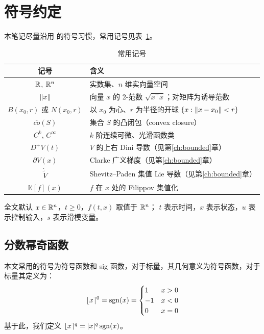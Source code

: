 \section{符号约定}\label{sec:notation}

本笔记尽量沿用 \cite{khalilNonlinearSystems} 的符号习惯，常用记号见表~\ref{tab:notation}。

\begin{table}[!htb]
  \centering
  \small
  \begin{tabular}{c|p{10cm}}
    \hline
    记号 & 含义 \\
    \hline
    $\mathbb{R}$, $\mathbb{R}^n$ & 实数集、$n$ 维实向量空间 \\
    $\left\lVert x\right\rVert$ & 向量 $x$ 的 2-范数 $\sqrt{x^\top x}$；对矩阵为诱导范数 \\
    $B(x_0,r)$ 或 $N(x_0,r)$ & 以 $x_0$ 为心、$r$ 为半径的开球 $\{x:\left\lVert x-x_0\right\rVert<r\}$ \\
    $\overline{co}(S)$ & 集合 $S$ 的凸闭包（convex closure） \\
    $C^k$, $C^\infty$ & $k$ 阶连续可微、光滑函数类 \\
    $D^+ V(t)$ & $V$ 的上右 Dini 导数（见第\ref{ch:bounded}章） \\
    $\partial V(x)$ & Clarke 广义梯度（见第\ref{ch:bounded}章） \\
    $\dot{\tilde V}$ & Shevitz--Paden 集值 Lie 导数（见第\ref{ch:bounded}章） \\
    $\mathbb{K}[f](x)$ & $f$ 在 $x$ 处的 Filippov 集值化 \\
    \hline
  \end{tabular}
  \caption{常用记号}
  \label{tab:notation}
\end{table}

全文默认 $x\in\mathbb{R}^n$，$t\geq 0$，$f(t,x)$ 取值于 $\mathbb{R}^n$；
$t$ 表示时间，$x$ 表示状态，$u$ 表示控制输入，$s$ 表示滑模变量。

\subsection{分数幂奇函数}

本文常用的符号为符号函数和 sig 函数，对于标量，其几何意义为符号函数，对于标量其定义为：
\begin{equation}
    \lfloor x \rceil^0=\operatorname{sgn}(x)=\begin{cases}
    	1   & x>0\\
    	-1 & x<0\\
    	0  & x=0\\
    \end{cases}
\end{equation}
基于此，我们定义 $\lfloor x \rceil^q=|x|^q \operatorname{sgn}(x)$。


